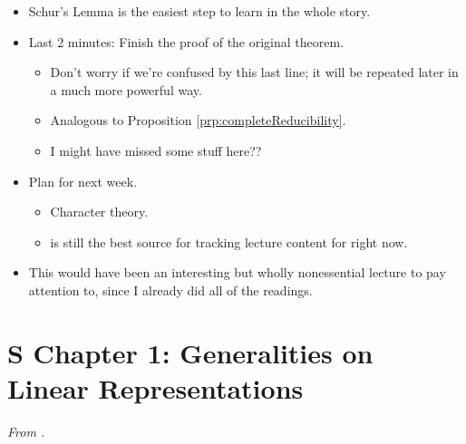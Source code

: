 \documentclass[../notes.tex]{subfiles}
\begin{document}
\begin{itemize}
\begin{itemize}
    \end{itemize}
    \item Schur's Lemma is the easiest step to learn in the whole story.
    \item Last 2 minutes: Finish the proof of the original theorem.
    \begin{itemize}
        \item Don't worry if we're confused by this last line; it will be repeated later in a much more powerful way.
        \item Analogous to Proposition \ref{prp:completeReducibility}.
        \item I might have missed some stuff here??
    \end{itemize}
    \item Plan for next week.
    \begin{itemize}
        \item Character theory.
        \item \textcite{bib:Serre} is still the best source for tracking lecture content for right now.
    \end{itemize}
    \item This would have been an interesting but wholly nonessential lecture to pay attention to, since I already did all of the readings.
\end{itemize}



\section{S Chapter 1: Generalities on Linear Representations}
\emph{From \textcite{bib:Serre}.}
\end{document}
